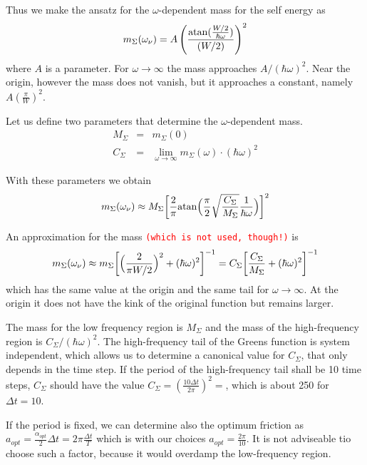 \documentclass[11pt,a4paper]{report}
\newcommand{\petertt}[1]{\textcolor{red}{\texttt{#1}}}
\begin{document}
Thus we make the ansatz for the $\omega$-dependent mass for the self energy as
\begin{eqnarray}
m_\Sigma(\omega_\nu)=A\left(\frac{{\rm atan}(\frac{W/2}{\hbar\omega})}{(W/2)}\right)^2
\end{eqnarray}
where $A$ is a parameter.
For $\omega\rightarrow\infty$ the mass approaches
$A/(\hbar\omega)^2$. Near the origin, however the mass does not
vanish, but it approaches a constant, namely
$A(\frac{\pi}{W})^2$.

Let us define two parameters that determine the $\omega$-dependent mass.
\begin{eqnarray}
M_\Sigma&=&m_\Sigma(0)
\\
C_\Sigma&=&\lim_{\omega\rightarrow\infty} m_\Sigma(\omega)\cdot(\hbar\omega)^2
\end{eqnarray}

With these parameters we obtain
\begin{eqnarray}
m_\Sigma(\omega_\nu)\approx M_\Sigma
\biggl[
\frac{2}{\pi}
{\rm atan}\Bigl(\frac{\pi}{2}
\sqrt{\frac{C_\Sigma}{M_\Sigma}}\frac{1}{\hbar\omega}\Bigr)
\biggr]^2
\end{eqnarray}

An approximation for the mass \petertt{(which is not used, though!)} is
\begin{eqnarray}
m_\Sigma(\omega_\nu)\approx m_\Sigma
\biggl[\Bigl(\frac{2}{\pi W/2}\Bigr)^2+(\hbar\omega)^2\biggr]^{-1}
=C_\Sigma
\biggl[\frac{C_\Sigma}{M_\Sigma}+(\hbar\omega)^2\biggr]^{-1}
\end{eqnarray}
which has the same value at the origin and the same tail for
$\omega\rightarrow\infty$. At the origin it does not have the kink of
the original function but remains larger.

The mass for the low frequency region is $M_\Sigma$ and the mass of
the high-frequency region is $C_\Sigma/(\hbar\omega)^2$.  The
high-frequency tail of the Greens function is system independent,
which allows us to determine a canonical value for $C_\Sigma$, that
only depends in the time step. If the period of the high-frequency
tail shall be 10 time steps, $C_\Sigma$ should have the value
$C_\Sigma=\left(\frac{10\Delta t}{2\pi}\right)^2=$, which is about 250
for $\Delta t=10$.

If the period is fixed, we can determine also the optimum friction as
$a_{opt}=\frac{\alpha_{opt}}{2}\Delta t=2\pi\frac{\Delta t}{T}$ which
is with our choices $a_{opt}=\frac{2\pi}{10}$. It is not adviseable
tio choose such a factor, because it would overdamp the low-frequency
region.
\end{document}
